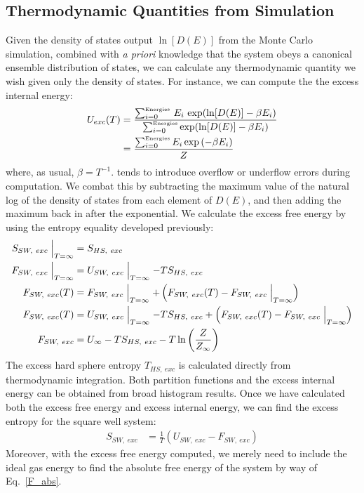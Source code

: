 \documentclass[12pt]{article}
\begin{document}
\subsection{Thermodynamic Quantities from Simulation}
Given the density of states output $\ln[D(E)]$ from the Monte Carlo simulation, combined with {\it a priori} knowledge that the system obeys a canonical ensemble distribution of states, we can calculate any thermodynamic quantity we wish given only the density of states. For instance, we can compute the the excess internal energy:
\begin{align}
     U_{exc}(T) &= \frac{\sum_{i=0}^{\text{\tiny Energies}}\,E_i\, \exp(\ln[D(E)] - \beta E_i)}{\sum_{i=0}^{\text{\tiny Energies}} \exp(\ln[D(E)] - \beta E_i)}\\
     &= \frac{\sum_{i=0}^{\text{\tiny Energies}} E_i \exp\left(-\beta E_i\right)}{Z}
\end{align} 
where, as usual, $\beta = T^{-1}$. tends to introduce overflow or underflow errors during computation. We combat this by subtracting the maximum value of the natural log of the density of states from each element of $D(E)$, and then adding the maximum back in after the exponential. We calculate the excess free energy by using the entropy equality developed previously:
\begin{align}
     S_{SW,~exc}\Bigm\lvert_{T=\infty} &= S_{HS,~exc}\\
     F_{SW,~exc}\Bigm\lvert_{T=\infty} &= U_{SW,~exc}\Bigm\lvert_{T=\infty} -TS_{HS,~exc} \\
     F_{SW,~exc}(T) &= F_{SW,~exc}\Bigm\lvert_{T=\infty} + \left(F_{SW,~exc}(T) - F_{SW,~exc}\Bigm\lvert_{T=\infty}\right)
     \\
     F_{SW,~exc}(T) &= U_{SW,~exc}\Bigm\lvert_{T=\infty} -TS_{HS,~exc} + \left(F_{SW,~exc}(T) - F_{SW,~exc}\Bigm\lvert_{T=\infty}\right)
     \\
     F_{SW,~exc} &= U_{\infty} -TS_{HS,~exc} - T\ln\left(\frac{Z}{Z_{\infty}}\right)
\end{align} 
The excess hard sphere entropy $T_{HS,~exc}$ is calculated directly from thermodynamic integration. Both partition functions and the excess internal energy can be obtained from broad histogram results. Once we have calculated both the excess free energy and excess internal energy, we can find the excess entropy for the square well system:
\begin{align}
    S_{SW, ~exc} &= \frac{1}{T}\left(U_{SW,~exc} - F_{SW,~exc} \right)
\end{align}
Moreover, with the excess free energy computed, we merely need to include the ideal gas energy to find the absolute free energy of the system by way of Eq.~\ref{F_abs}. 
\end{document}
